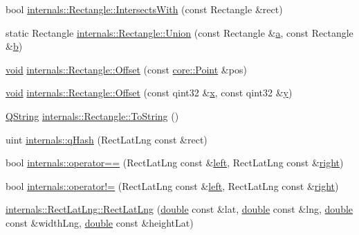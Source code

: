 \begin{DoxyCompactItemize}
\item 
bool \hyperlink{group___o_p_map_widget_gae5e839ee40fb95a93687ee17445de718}{internals\-::\-Rectangle\-::\-Intersects\-With} (const Rectangle \&rect)
\item 
static Rectangle \hyperlink{group___o_p_map_widget_ga9a93d2cc4abc1f3c2b053dca4311fd33}{internals\-::\-Rectangle\-::\-Union} (const Rectangle \&\hyperlink{glext_8h_ac8729153468b5dcf13f971b21d84d4e5}{a}, const Rectangle \&\hyperlink{glext_8h_a6eba317e3cf44d6d26c04a5a8f197dcb}{b})
\item 
\hyperlink{group___u_a_v_objects_plugin_ga444cf2ff3f0ecbe028adce838d373f5c}{void} \hyperlink{group___o_p_map_widget_ga66c531d30a3208df417c71ee0cb3ce72}{internals\-::\-Rectangle\-::\-Offset} (const \hyperlink{structcore_1_1_point}{core\-::\-Point} \&pos)
\item 
\hyperlink{group___u_a_v_objects_plugin_ga444cf2ff3f0ecbe028adce838d373f5c}{void} \hyperlink{group___o_p_map_widget_gaa8fc3eba71f76d8e6264cd610bb11952}{internals\-::\-Rectangle\-::\-Offset} (const qint32 \&\hyperlink{glext_8h_a1db9d104e3c2128177f26aff7b46982f}{x}, const qint32 \&\hyperlink{glext_8h_a42315f3ed8fff752bb47fd782309fcfc}{y})
\item 
\hyperlink{group___u_a_v_objects_plugin_gab9d252f49c333c94a72f97ce3105a32d}{Q\-String} \hyperlink{group___o_p_map_widget_gacc8a6c81527141fc59b3ba245b35c297}{internals\-::\-Rectangle\-::\-To\-String} ()
\item 
uint \hyperlink{group___o_p_map_widget_gaa7f2cebba412ed2292d9e59299b7fd07}{internals\-::q\-Hash} (Rect\-Lat\-Lng const \&rect)
\item 
bool \hyperlink{group___o_p_map_widget_gae075f9b2f8b993dfd37de8f38ef1b72b}{internals\-::operator==} (Rect\-Lat\-Lng const \&\hyperlink{glext_8h_a85b8f6c07fbc1fb5d77c2ae090f21995}{left}, Rect\-Lat\-Lng const \&\hyperlink{glext_8h_a5ffadbbacc6b89cf6218bc43b384d3fe}{right})
\item 
bool \hyperlink{group___o_p_map_widget_ga8957984d0dfe65bb3042d9fd7f36f043}{internals\-::operator!=} (Rect\-Lat\-Lng const \&\hyperlink{glext_8h_a85b8f6c07fbc1fb5d77c2ae090f21995}{left}, Rect\-Lat\-Lng const \&\hyperlink{glext_8h_a5ffadbbacc6b89cf6218bc43b384d3fe}{right})
\item 
\hyperlink{group___o_p_map_widget_ga4ae20976d028402ff59ecd45b52214be}{internals\-::\-Rect\-Lat\-Lng\-::\-Rect\-Lat\-Lng} (\hyperlink{_super_l_u_support_8h_a8956b2b9f49bf918deed98379d159ca7}{double} const \&lat, \hyperlink{_super_l_u_support_8h_a8956b2b9f49bf918deed98379d159ca7}{double} const \&lng, \hyperlink{_super_l_u_support_8h_a8956b2b9f49bf918deed98379d159ca7}{double} const \&width\-Lng, \hyperlink{_super_l_u_support_8h_a8956b2b9f49bf918deed98379d159ca7}{double} const \&height\-Lat)

\end{DoxyCompactItemize}
